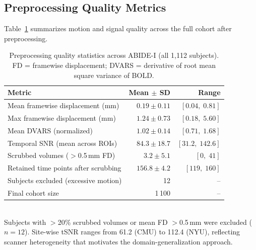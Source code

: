 \documentclass[runningheads]{llncs}
\begin{document}
\subsection{Preprocessing Quality Metrics}
Table~\ref{tab:preprocstats} summarizes motion and signal quality across the full cohort after preprocessing.
\begin{table}[t]
\centering
\caption{Preprocessing quality statistics across ABIDE-I (all 1,112 subjects). FD = framewise displacement; DVARS = derivative of root mean square variance of BOLD.}
\label{tab:preprocstats}
\setlength{\tabcolsep}{5pt}
\small
\begin{tabular}{lrr}
\toprule
\textbf{Metric} & \textbf{Mean $\pm$ SD} & \textbf{Range} \\
\midrule
Mean framewise displacement (mm)      & $0.19 \pm 0.11$ & $[0.04,\;0.81]$ \\
Max framewise displacement (mm)       & $1.24 \pm 0.73$ & $[0.18,\;5.60]$ \\
Mean DVARS (normalized)               & $1.02 \pm 0.14$ & $[0.71,\;1.68]$ \\
Temporal SNR (mean across ROIs)       & $84.3 \pm 18.7$ & $[31.2,\;142.6]$ \\
Scrubbed volumes ($>$0.5\,mm FD)      & $3.2  \pm 5.1$  & $[0,\;41]$ \\
Retained time points after scrubbing  & $156.8\pm 4.2$  & $[119,\;160]$ \\
Subjects excluded (excessive motion)  & 12              & -- \\
Final cohort size                     & 1\,100          & -- \\
\bottomrule
\end{tabular}
\\[3pt]
{\footnotesize Subjects with $>$20\% scrubbed volumes or mean FD $>$0.5\,mm were excluded ($n{=}12$). Site-wise tSNR ranges from 61.2 (CMU) to 112.4 (NYU), reflecting scanner heterogeneity that motivates the domain-generalization approach.}
\end{table}
\end{document}
